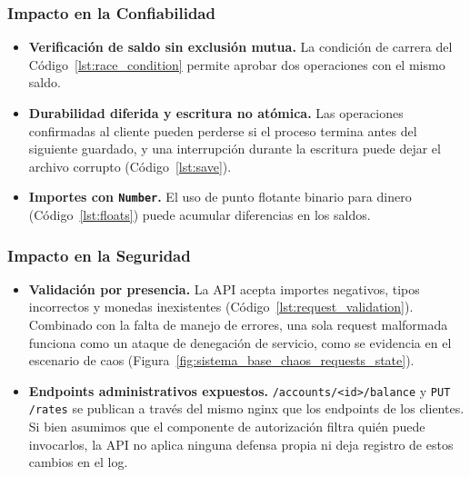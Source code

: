         \subsubsection{Impacto en la Confiabilidad}
        \label{sec:impacto_en_la_confiabilidad}

        \begin{itemize}
            \item \textbf{Verificación de saldo sin exclusión mutua.} La condición de
            carrera del Código~\ref{lst:race_condition} permite aprobar dos operaciones con
            el mismo saldo.
            \item \textbf{Durabilidad diferida y escritura no atómica.} Las operaciones
            confirmadas al cliente pueden perderse si el proceso termina antes del
            siguiente guardado, y una interrupción durante la escritura puede dejar el
            archivo corrupto (Código~\ref{lst:save}).
            \item \textbf{Importes con \texttt{Number}.} El uso de punto flotante binario
            para dinero (Código~\ref{lst:floats}) puede acumular diferencias en los saldos.
        \end{itemize}

        \subsubsection{Impacto en la Seguridad}
        \label{sec:impacto_en_la_seguridad}

        \begin{itemize}
            \item \textbf{Validación por presencia.} La API acepta importes negativos,
            tipos incorrectos y monedas inexistentes (Código~\ref{lst:request_validation}).
            Combinado con la falta de manejo de errores, una sola request malformada
            funciona como un ataque de denegación de servicio, como se evidencia en el
            escenario de caos (Figura~\ref{fig:sistema_base_chaos_requests_state}).
            \item \textbf{Endpoints administrativos expuestos.} \texttt{/accounts/<id>/balance}
            y \texttt{PUT /rates} se publican a través del mismo nginx que los endpoints de
            los clientes. Si bien asumimos que el componente de autorización filtra quién
            puede invocarlos, la API no aplica ninguna defensa propia ni deja registro de
            estos cambios en el log.
        \end{itemize}

